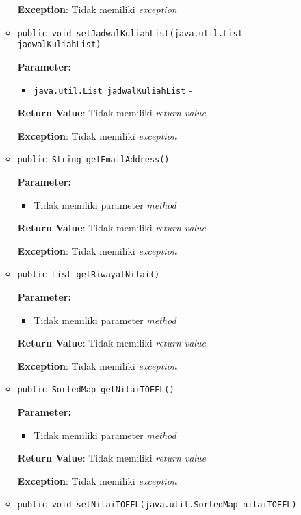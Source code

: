 \documentclass{article}
\begin{document}
\begin{enumerate}
\begin{itemize}
\textbf{Exception}: Tidak memiliki \textit{exception}

\item \texttt{public void setJadwalKuliahList(java.util.List jadwalKuliahList)}



\textbf{Parameter:}
\begin{itemize}
\item \texttt{java.util.List jadwalKuliahList} - 
\end{itemize}
\textbf{Return Value}: Tidak memiliki \textit{return value}

\textbf{Exception}: Tidak memiliki \textit{exception}

\item \texttt{public String getEmailAddress()}



\textbf{Parameter:}
\begin{itemize}
\item Tidak memiliki parameter \textit{method}
\end{itemize}
\textbf{Return Value}: Tidak memiliki \textit{return value}

\textbf{Exception}: Tidak memiliki \textit{exception}

\item \texttt{public List getRiwayatNilai()}



\textbf{Parameter:}
\begin{itemize}
\item Tidak memiliki parameter \textit{method}
\end{itemize}
\textbf{Return Value}: Tidak memiliki \textit{return value}

\textbf{Exception}: Tidak memiliki \textit{exception}

\item \texttt{public SortedMap getNilaiTOEFL()}



\textbf{Parameter:}
\begin{itemize}
\item Tidak memiliki parameter \textit{method}
\end{itemize}
\textbf{Return Value}: Tidak memiliki \textit{return value}

\textbf{Exception}: Tidak memiliki \textit{exception}

\item \texttt{public void setNilaiTOEFL(java.util.SortedMap nilaiTOEFL)}




\end{itemize}
\end{enumerate}
\end{document}
